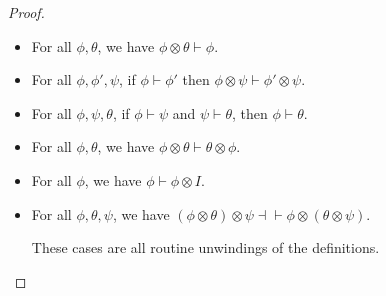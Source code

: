 \begin{proof}
\begin{itemize}
\item For all $\phi, \theta$, we have $\phi \otimes \theta \vdash \phi$.
\item For all $\phi, \phi', \psi$, if $\phi \vdash \phi'$ then $\phi \otimes \psi \vdash \phi' \otimes \psi$.
\item For all $\phi, \psi, \theta$, if $\phi \vdash \psi$ and $\psi \vdash \theta$, then $\phi \vdash \theta$. 
\item For all $\phi, \theta$, we have $\phi \otimes \theta \vdash \theta \otimes \phi$. 
\item For all $\phi$, we have $\phi \vdash \phi \otimes I$. 
\item For all $\phi, \theta, \psi$, we have $(\phi \otimes \theta) \otimes \psi \dashv\vdash \phi \otimes (\theta \otimes \psi)$. 

  These cases are all routine unwindings of the definitions. 


\end{itemize}
\end{proof}
